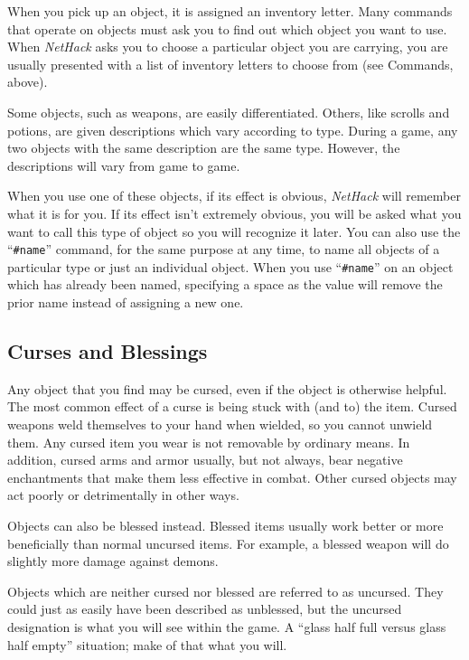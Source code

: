 When you pick up an object, it is assigned an inventory letter.  Many
commands that operate on objects must ask you to find out which object
you want to use.  When {\it NetHack\/} asks you to choose a particular object
you are carrying, you are usually presented with a list of inventory
letters to choose from (see Commands, above).

Some objects, such as weapons, are easily differentiated.  Others, like
scrolls and potions, are given descriptions which vary according to
type.  During a game, any two objects with the same description are
the same type.  However, the descriptions will vary from game to game.

When you use one of these objects, if its effect is obvious, {\it NetHack\/}
will remember what it is for you.  If its effect isn't extremely
obvious, you will be asked what you want to call this type of object
so you will recognize it later.  You can also use the ``{\tt \#name}''
command, for the same purpose at any time, to name
all objects of a particular type or just an individual object.
When you use ``{\tt \#name}'' on an object which has already been named,
specifying a space as the value will remove the prior name instead
of assigning a new one.

\subsection*{Curses and Blessings}

Any object that you find may be cursed, even if the object is
otherwise helpful.  The most common effect of a curse is being stuck
with (and to) the item.  Cursed weapons weld themselves to your hand
when wielded, so you cannot unwield them.  Any cursed item you wear
is not removable by ordinary means.  In addition, cursed arms and armor
usually, but not always, bear negative enchantments that make them
less effective in combat.  Other cursed objects may act poorly or
detrimentally in other ways.

Objects can also be blessed instead.
Blessed items usually work better or more beneficially than normal
uncursed items.
For example, a blessed weapon will do slightly more damage against demons.

Objects which are neither cursed nor blessed are referred to as uncursed.
They could just as easily have been described as unblessed, but the
uncursed designation is what you will see within the game.  A ``glass
half full versus glass half empty'' situation; make of that what you will.

